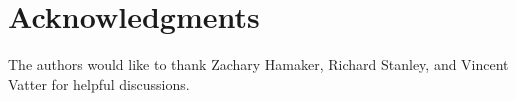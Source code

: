\documentclass[12pt]{amsart}  %
\theoremstyle{definition}
\theoremstyle{remark}
\numberwithin{equation}{section}
\begin{document}
\section{Acknowledgments}
The authors would like to thank Zachary Hamaker, Richard Stanley, and Vincent Vatter for helpful discussions.

\printbibliography

%
%
%
%
%
%
%
%
%
%
%
%
%
\end{document}
